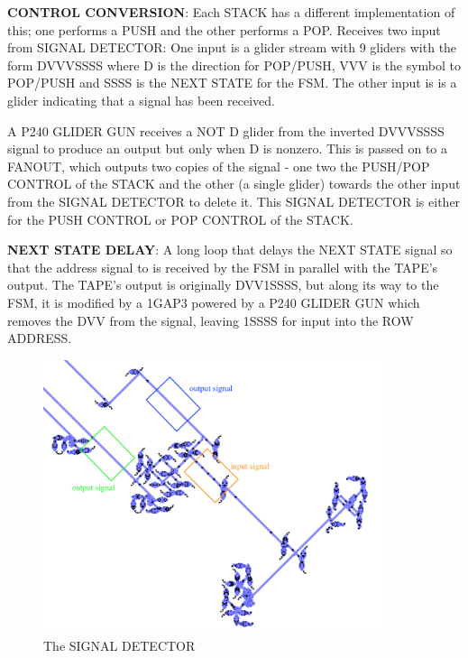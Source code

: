 \documentclass{article}
\begin{document}
\noindent\textbf{CONTROL CONVERSION}: Each STACK has a different implementation of this; one performs a PUSH and the other performs a POP. Receives two input from SIGNAL DETECTOR: One input is a glider stream with 9 gliders with the form DVVVSSSS where D is the direction for POP/PUSH, VVV is the symbol to POP/PUSH and SSSS is the NEXT STATE for the FSM. The other input is is a glider indicating that a signal has been received.



A P240 GLIDER GUN receives a NOT D glider from the inverted DVVVSSSS signal to produce an output but only when D is nonzero. This is passed on to a FANOUT, which outputs two copies of the signal - one two the PUSH/POP CONTROL of the STACK and the other (a single glider) towards the other input from the SIGNAL DETECTOR to delete it. This SIGNAL DETECTOR is either for the PUSH CONTROL or POP CONTROL of the STACK.



\vspace{1em}

\noindent\textbf{NEXT STATE DELAY}: A long loop that delays the NEXT STATE signal so that the address signal to is received by the FSM in parallel with the TAPE's output. The TAPE's output is originally DVV1SSSS, but along its way to the FSM, it is modified by a 1GAP3 powered by a P240 GLIDER GUN which removes the DVV from the signal, leaving 1SSSS for input into the ROW ADDRESS.

\vspace{1em}

\begin{figure}[h]
\centering
\includegraphics[width=10cm,keepaspectratio]{images/SIGNAL-DETECTOR.png}
\captionsetup{labelformat=empty} \caption{The SIGNAL DETECTOR}
\end{figure}
\end{document}
